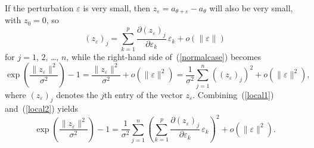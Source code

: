 \documentclass[]{fairmeta}
\renewcommand{\epsilon}{\varepsilon}
\begin{document}
If the perturbation $\epsilon$ is very small,
then $z_{\epsilon} = a_{\theta + \epsilon} - a_{\theta}$
will also be very small, with $z_0 = 0$, so
%
\begin{equation}
\label{local1}
(z_{\epsilon})_j
= \sum_{k=1}^p \frac{\partial (z_{\epsilon})_j}{\partial \epsilon_k}
  \, \epsilon_k + o(\|\epsilon\|)
\end{equation}
%
for $j = 1$, $2$, \dots, $n$, while the right-hand side of~(\ref{normalcase})
becomes
%
\begin{equation}
\label{local2}
\exp\left( \frac{\|z_{\epsilon}\|^2}{\sigma^2} \right) - 1
= \frac{\|z_{\epsilon}\|^2}{\sigma^2} + o(\|\epsilon\|^2)
= \frac{1}{\sigma^2} \sum_{j=1}^n ((z_{\epsilon})_j)^2 + o(\|\epsilon\|^2),
\end{equation}
%
where $(z_{\epsilon})_j$ denotes the $j$th entry of the vector $z_{\epsilon}$.
Combining~(\ref{local1}) and~(\ref{local2}) yields
%
\begin{equation}
\label{anyeps}
\exp\left( \frac{\|z_{\epsilon}\|^2}{\sigma^2} \right) - 1
= \frac{1}{\sigma^2} \sum_{j=1}^n \left( \sum_{k=1}^p
  \frac{\partial (z_{\epsilon})_j}{\partial \epsilon_k} \, \epsilon_k \right)^2
  + o(\|\epsilon\|^2).
\end{equation}
\end{document}
